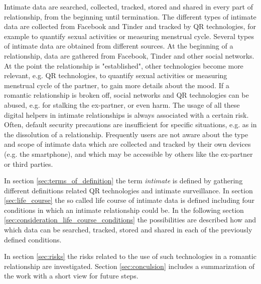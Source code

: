 Intimate data are searched, collected, tracked, stored and shared in every part of relationship, from the beginning until termination.
The different types of intimate data are collected from Facebook and Tinder and tracked by \acl{QR} technologies, for example to quantify sexual activities or measuring menstrual cycle.
Several types of intimate data are obtained from different sources. At the beginning of a relationship, data are gathered from Facebook, Tinder and other social networks.
At the point the relationship is "established", other technologies become more relevant, e.g. \acs{QR} technologies, to quantify sexual activities or measuring menstrual cycle of the partner, to gain more details about the mood.
If a romantic relationship is broken off, social networks and \acs{QR} technologies can be abused, e.g. for stalking the ex-partner, or even harm. 
The usage of all these digital helpers in intimate relationships is always associated with a certain risk.
Often, default security precautions are insufficient for specific situations, e.g. as in the dissolution of a relationship. 
Frequently users are not aware about the type and scope of intimate data which are collected and tracked by their own devices (e.g. the smartphone), and which may be accessible by others like the ex-partner or third parties.

In section \ref{sec:terms_of_definition} the term \textit{intimate} is defined by gathering different definitions related \acs{QR} technologies and intimate surveillance.
In section \ref{sec:life_course} the so called life course of intimate data is defined including four conditions in which an intimate relationship could be.
In the following section \ref{sec:consideration_life_course_conditions} the possibilities are described how and which data can be searched, tracked, stored and shared in each of the previously defined conditions.

In section \ref{sec:risks} the risks related to the use of such technologies in a romantic relationship are investigated.
Section \ref{sec:conculsion} includes a summarization of the work with a short view for future steps.